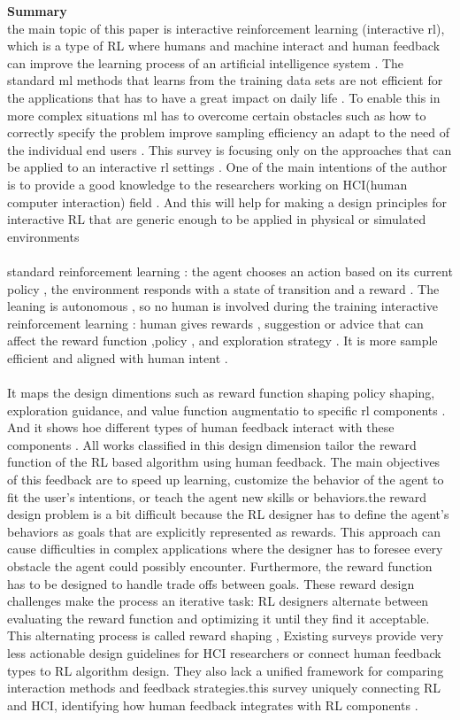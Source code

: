 \documentclass[report.tex]{subfiles}
\begin{document}
\noindent\textbf{Summary} \\
the main topic of this paper is interactive reinforcement learning (interactive rl), which is a type of RL where humans and machine interact and human feedback can improve the learning process of an artificial intelligence system . The standard ml methods that learns from the training data sets are not efficient for the applications that has to have a great impact on daily life .  To enable this in more complex situations ml has to overcome certain obstacles such as how to correctly specify the problem improve sampling efficiency an adapt to the need of the individual end users . This survey is focusing only on the approaches that can be applied to an interactive rl settings . One of the main intentions of the author is to provide a good knowledge to the researchers working on HCI(human computer interaction) field . And this will help for making a design principles for interactive RL  that are generic enough to be applied in physical or simulated environments  
\noindent\textbf{}\\\\standard reinforcement learning : the agent chooses an action based on its current policy , the environment responds with a state of transition and a reward . The leaning is autonomous , so no human is involved during the training 
interactive reinforcement learning : human gives rewards , suggestion or advice that can affect the reward function ,policy , and exploration strategy . It is more sample efficient and aligned with human intent . 
\noindent\textbf{}\\\\
It maps the design dimentions such as reward function shaping policy shaping, exploration guidance, and value function augmentatio to specific rl components . And it shows hoe different types of human feedback interact with these components . All works classified in this design dimension tailor the reward function of the RL based algorithm using human feedback. The main objectives of this feedback are to speed up learning, customize the behavior of the agent to fit the user’s intentions, or teach the agent new skills or behaviors.the reward design problem is a bit difficult because the RL designer has to define the agent’s behaviors as goals that are explicitly represented as rewards. This approach can cause difficulties in complex applications where the designer has to foresee every obstacle the agent could possibly encounter. Furthermore, the reward function has to be designed  to handle trade offs between goals. These reward design challenges make the process an iterative task: RL designers alternate between evaluating the reward function and optimizing it until they find it acceptable. This alternating process is called reward shaping , Existing surveys provide very less actionable design guidelines for HCI researchers or connect human feedback types to RL algorithm design. They also lack a unified framework for comparing interaction methods and feedback strategies.this survey uniquely connecting  RL and HCI, identifying how human feedback integrates with RL components . \\\\
\end{document}
